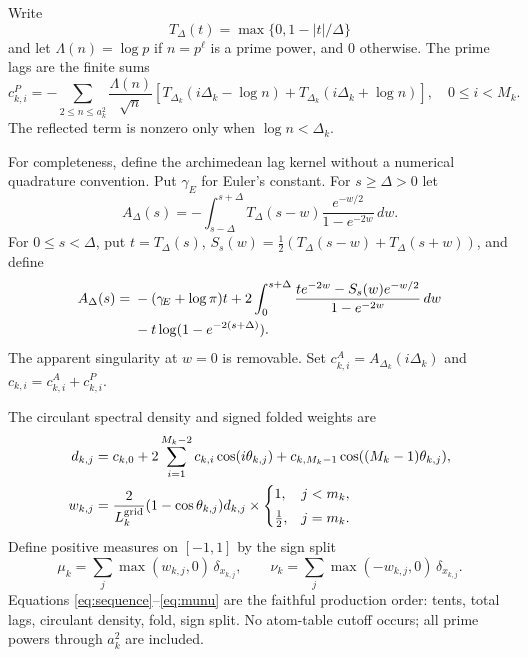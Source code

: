\documentclass[11pt]{article}
\begin{document}
Write
\[
 T_\Delta(t)=\max\{0,1-|t|/\Delta\}
\]
and let $\Lambda(n)=\log p$ if $n=p^\ell$ is a prime power, and
$0$ otherwise.  The prime lags are the finite sums
\begin{equation}\label{eq:prime-lag}
 c^P_{k,i}
 =-\sum_{2\le n\le a_k^2}\frac{\Lambda(n)}{\sqrt n}
 \left[
 T_{\Delta_k}(i\Delta_k-\log n)
 +T_{\Delta_k}(i\Delta_k+\log n)
 \right],
 \quad 0\le i<M_k .
\end{equation}
The reflected term is nonzero only when $\log n<\Delta_k$.

For completeness, define the archimedean lag kernel without a
numerical quadrature convention.  Put $\gamma_{\!E}$ for Euler's
constant.  For $s\ge\Delta>0$ let
\begin{equation}\label{eq:arch-far}
 A_\Delta(s)=-
 \int_{s-\Delta}^{s+\Delta}
 T_\Delta(s-w)\frac{e^{-w/2}}{1-e^{-2w}}\,dw .
\end{equation}
For $0\le s<\Delta$, put $t=T_\Delta(s)$,
$S_s(w)=\frac12(T_\Delta(s-w)+T_\Delta(s+w))$, and define
\begin{align}
A_\Delta(s)={}&-(\gamma_{\!E}+\log\pi)t
+2\int_0^{s+\Delta}
\frac{t e^{-2w}-S_s(w)e^{-w/2}}{1-e^{-2w}}\,dw \notag\\
&{}-t\log(1-e^{-2(s+\Delta)}).
\label{eq:arch-near}
\end{align}
The apparent singularity at $w=0$ is removable.  Set
$c^A_{k,i}=A_{\Delta_k}(i\Delta_k)$ and
$c_{k,i}=c^A_{k,i}+c^P_{k,i}$.

The circulant spectral density and signed folded weights are
\begin{align}
d_{k,j}
 &=
 c_{k,0}+2\sum_{i=1}^{M_k-2}c_{k,i}\cos(i\theta_{k,j})
 +c_{k,M_k-1}\cos((M_k-1)\theta_{k,j}),\label{eq:density}\\
w_{k,j}
 &=
\frac{2}{L_k^{\rm grid}}(1-\cos\theta_{k,j})d_{k,j}
\times
\begin{cases}
1,&j<m_k,\\[1mm]
\frac12,&j=m_k.
\end{cases}\label{eq:fold-weight}
\end{align}
Define positive measures on $[-1,1]$ by the sign split
\begin{equation}\label{eq:munu}
 \mu_k=\sum_j\max(w_{k,j},0)\,\delta_{x_{k,j}},
 \qquad
 \nu_k=\sum_j\max(-w_{k,j},0)\,\delta_{x_{k,j}} .
\end{equation}
Equations \eqref{eq:sequence}--\eqref{eq:munu} are the faithful
production order: tents, total lags, circulant density, fold, sign
split.  No atom-table cutoff occurs; all prime powers through
$a_k^2$ are included.
\end{document}
